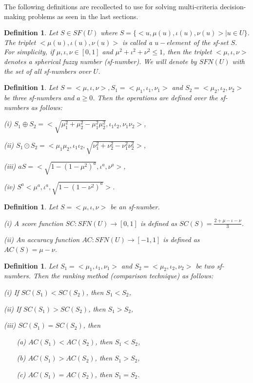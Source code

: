 \documentclass{IJFS}
\newtheorem{definition}[theorem]{Definition}
\begin{document}
The following definitions are recollected to use for solving multi-criteria decision-making problems as seen in the last sections.

\begin{definition} Let  $S\in SF(U)$ where $S=\{<u, \mu(u), \iota(u), \nu(u)>|u\in U\}$. The triplet  $<\mu(u), \iota(u),
\nu(u)>$ is called a $u-element$ of the sf-set $S$. For
simplicity, if $\mu,\iota, \nu \in [0,1]$ and
$\mu^2+\iota^2+\nu^2\le 1$, then the triplet $<\mu,\iota, \nu>$
denotes a spherical fuzzy number (sf-number). We will denote by
$SFN(U)$ with the set of all sf-numbers over $U$.
\end{definition}

\begin{definition} \cite{as00}
Let $S=<\mu, \iota,\nu>, S_1=<\mu_1,\iota_1,\nu_1>$ and
$S_2=<\mu_2,\iota_2,\nu_2>$ be three sf-numbers and $a\ge0$. Then
the operations are defined over the sf-numbers as follows:

(i) $S_1 \oplus S_2=<\sqrt{\mu_1^2+\mu_2^2-\mu_1^2\mu_2^2},
\iota_1\iota_2,\nu_1\nu_2>$,

(ii) $S_1 \odot S_2=<\mu_1\mu_2,
\iota_1\iota_2,\sqrt{\nu_1^2+\nu_2^2-\nu_1^2\nu_2^2}>$,

(iii) $aS=<\sqrt{1-(1-\mu^2)^a},\iota^{a},\nu^{a}>$,

(iv) ${S^a}<\mu^{a}, \iota^{a},\sqrt{1-(1-\nu^2)^a}>$.
\end{definition}


\begin{definition} \cite{as00} Let  $S=<\mu,\iota,\nu>$ be an sf-number.

(i) A score function $SC:SFN(U)\to [0,1]$ is defined as
$SC(S)=\frac{2+\mu-\iota-\nu}{3}$.

(ii) An accuracy function $AC:SFN(U)\to [-1,1]$ is defined as
$AC(S)=\mu-\nu$.
\end{definition}


\begin{definition} \cite{as00} Let  $S_1=<\mu_1,\iota_1,\nu_1>$ and $S_2=<\mu_2,\iota_2,\nu_2>$ be two sf-numbers. Then the ranking method (comparison technique) as
follows:

(i) If $SC(S_1)<SC(S_2)$, then $S_1<S_2$,

(ii) If $SC(S_1)>SC(S_2)$, then $S_1>S_2$,

(iii) $SC(S_1)=SC(S_2)$, then

~~~ (a) $AC(S_1)<AC(S_2)$, then $S_1<S_2$,

~~~ (b) $AC(S_1)>AC(S_2)$, then $S_1>S_2$,

~~~ (c) $AC(S_1)=AC(S_2)$, then $S_1=S_2$.

\end{definition}
\end{document}
